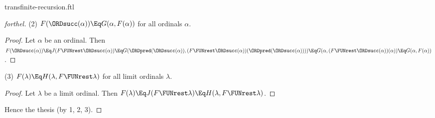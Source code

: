 \documentclass{stex}
\begin{document}
\begin{smodule}{transfinite-recursion.ftl}
\begin{proof}[forthel]
  (2) $F(\ORDsucc(\alpha)) \Eq G(\alpha, F(\alpha))$ for all ordinals $\alpha$.
  \begin{proof}
    Let $\alpha$ be an ordinal.
    Then $F(\ORDsucc(\alpha))
      \Eq J(F \FUNrest \ORDsucc(\alpha))
      \Eq\linebreak G(\ORDpred(\ORDsucc(\alpha)), (F \FUNrest \ORDsucc(\alpha))(\ORDpred(\ORDsucc(\alpha))))
      \Eq G(\alpha, (F \FUNrest \ORDsucc(\alpha))(\alpha))
      \Eq\linebreak G(\alpha, F(\alpha))$.
  \end{proof}

  (3) $F(\lambda) \Eq H(\lambda, F \FUNrest \lambda)$ for all limit ordinals $\lambda$.
  \begin{proof}
    Let $\lambda$ be a limit ordinal.
    Then $F(\lambda)
      \Eq J(F \FUNrest \lambda)
      \Eq H(\lambda, F \FUNrest \lambda)$.
  \end{proof}

  Hence the thesis (by 1, 2, 3).
\end{proof}

\printbibliography
{}
\end{smodule}
\end{document}
